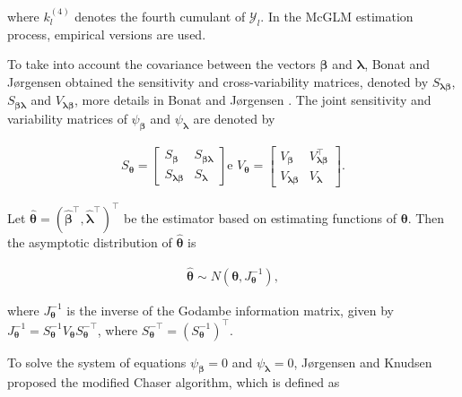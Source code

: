 \documentclass[USenglish]{article}
\theoremstyle{dgthm}
\theoremstyle{dgdef}
\begin{document}
\noindent where $k_{l}^{(4)}$ denotes the fourth cumulant of $\mathcal{Y}_{l}$. In the McGLM estimation process, empirical versions are used.

To take into account the covariance between the vectors $\boldsymbol{\beta}$ and $\boldsymbol{\lambda}$, Bonat and Jørgensen \cite{Bonat16} obtained the sensitivity and cross-variability matrices, denoted by $S_{\boldsymbol{ \lambda \beta}}$, $S_{\boldsymbol{\beta \lambda}}$ and $V_{\boldsymbol{\lambda \beta}}$, more details in Bonat and Jørgensen \cite{Bonat16}. The joint sensitivity and variability matrices of $\psi_{\boldsymbol{\beta}}$ and $\psi_{\boldsymbol{\lambda}}$ are denoted by

$$
  \begin{aligned}
    S_{\boldsymbol{\theta}} = \begin{bmatrix}
      S_{\boldsymbol{\beta}} & S_{\boldsymbol{\beta\lambda}} \\ 
      S_{\boldsymbol{\lambda\beta}} & S_{\boldsymbol{\lambda}} 
      \end{bmatrix} \text{e } V_{\boldsymbol{\theta}} = \begin{bmatrix}
      V_{\boldsymbol{\beta}} & V^{\top}_{\boldsymbol{\lambda\beta}} \\ 
      V_{\boldsymbol{\lambda\beta}} & V_{\boldsymbol{\lambda}} 
    \end{bmatrix}.
  \end{aligned}
$$

Let $\boldsymbol{\hat{\theta}} = (\boldsymbol{\hat{\beta}^{\top}}, \boldsymbol{\hat{\lambda}^{\top}})^{\top }$ be the estimator based on estimating functions of $\boldsymbol{\theta}$. Then the asymptotic distribution of $\boldsymbol{\hat{\theta}}$ is

$$
  \begin{aligned}
    \boldsymbol{\hat{\theta}} \sim N(\boldsymbol{\theta}, J_{\boldsymbol{\theta}}^{-1}),
  \end{aligned}
$$

\noindent where $J_{\boldsymbol{\theta}}^{-1}$ is the inverse of the Godambe information matrix, given by $J_{\boldsymbol{\theta}}^{-1} = S_{ \boldsymbol{\theta}}^{-1} V_{\boldsymbol{\theta}} S_{\boldsymbol{\theta}}^{-\top}$, where $S_{\boldsymbol{\theta}} ^{-\top} = (S_{\boldsymbol{\theta}}^{-1})^{\top}.$

To solve the system of equations $\psi_{\boldsymbol{\beta}} = 0$ and $\psi_{\boldsymbol{\lambda}} = 0$, Jørgensen and Knudsen \cite{jorg04} proposed the modified Chaser algorithm, which is defined as
\end{document}
